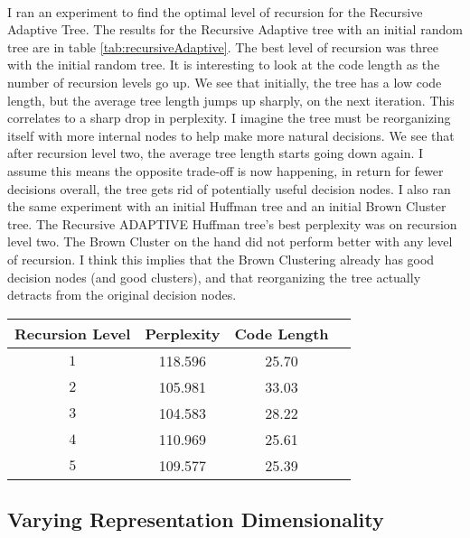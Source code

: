 \paragraph{}
I ran an experiment to find the optimal level of recursion for the Recursive Adaptive Tree. The results for the Recursive Adaptive tree with an initial random tree are in table \ref{tab:recursiveAdaptive}. The best level of recursion was three with the initial random tree. It is interesting to look at the code length as the number of recursion levels go up. We see that initially, the tree has a low code length, but the average tree length jumps up sharply, on the next iteration. This correlates to a sharp drop in perplexity. I imagine the tree must be reorganizing itself with more internal nodes to help make more natural decisions. We see that after recursion level two, the average tree length starts going down again. I assume this means the opposite trade-off is now happening, in return for fewer decisions overall, the tree gets rid of potentially useful decision nodes. I also ran the same experiment with an initial Huffman tree and an initial Brown Cluster tree. The Recursive ADAPTIVE Huffman tree's best perplexity was on recursion level two. The Brown Cluster on the hand did not perform better with any level of recursion. I think this implies that the Brown Clustering already has good decision nodes (and good clusters), and that reorganizing the tree actually detracts from the original decision nodes.
\begin{table*} \centering
{}
\begin{tabular}{@{}cccc@{}}\toprule
Recursion Level & Perplexity & Code Length\\ 
\midrule
$1$ & 118.596 & 25.70\\
$2$ & 105.981 & 33.03\\
$3$ & 104.583 & 28.22\\
$4$ & 110.969 & 25.61\\
$5$ & 109.577 & 25.39\\
\bottomrule
\end{tabular}
\caption{The effect of more recursion levels on the Recursive ADAPTIVE tree with an initial random tree}
\label{tab:recursiveAdaptive}
\end{table*}

\subsection{Varying Representation Dimensionality}
